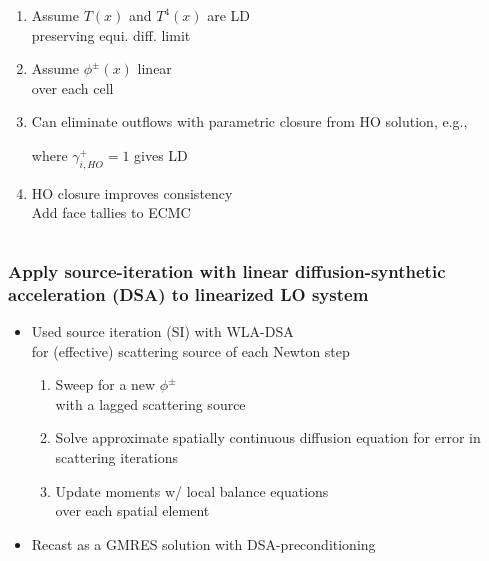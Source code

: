 \documentclass[xcolor=dvipsnames,hyperref={pdfpagelabels=false},unknownkeysallowed]{beamer}
\newcommand{\colb}[1]{{\color{blue} #1}}
\newcommand{\colG}[1]{{\color{Gray!110} #1}}
\newlength{\wideitemsep}
\let\olditem\item
\renewcommand{\item}{\setlength{\itemsep}{\wideitemsep}\olditem}
\newcommand{\mom}[1]{\langle #1 \rangle}
\begin{document}
\begin{frame}
\begin{columns}
\begin{column}{0.75\linewidth}
    \addtolength{\wideitemsep}{0.11in}
    {        \fontsize{11.0pt}{10.2pt}\selectfont
    \begin{enumerate}
        \item Assume $T(x)$ and $T^4(x)$ are LD \\
            \colG{preserving equi. diff. limit}
        \item Assume $\phi^{\pm}(x)$ linear  \\ 
            \colG{over each cell}
        \item Can eliminate outflows with parametric closure from HO solution, e.g., \vspace{0.1in}
            \begin{center}{\textcolor{Gray}{%
                    \fbox{ {\color{black} $\displaystyle  
            \phi_{i+1/2}^+ = \colb{\gamma_{i,HO}^+}\mom{\phi}_{a,i}^+ + \mom{\phi}_{x,i}^+$}}}}
            \end{center}
            \colG{where  {$\gamma_{i,HO}^+ = 1$ gives LD}}
        \item[] HO closure improves consistency
            \\ \colG{Add face tallies to ECMC}
       \end{enumerate}
   }
    \end{column}
\end{columns}
\end{frame}

\begin{frame}
    \frametitle{Apply source-iteration with linear diffusion-synthetic acceleration (DSA)
    to linearized LO system}
    \begin{itemize}
        \item[] Used source iteration (SI) with WLA-DSA  \\ \colG{for (effective) scattering source
            of each Newton step}
            \vspace{0.1in}
            \begin{enumerate}
                \item Sweep for a new $\phi^{\pm}$ \\ \colG{with a lagged scattering
                    source}
                \item Solve approximate \colb{spatially continuous} diffusion equation for error in
                    scattering iterations
                \item Update moments w/ local balance equations 
                    \\ \colG{over each spatial element}
            \end{enumerate}
            \pause
         \item[] Recast as a GMRES solution with DSA-preconditioning
     \end{itemize}
\end{frame}
\end{document}
